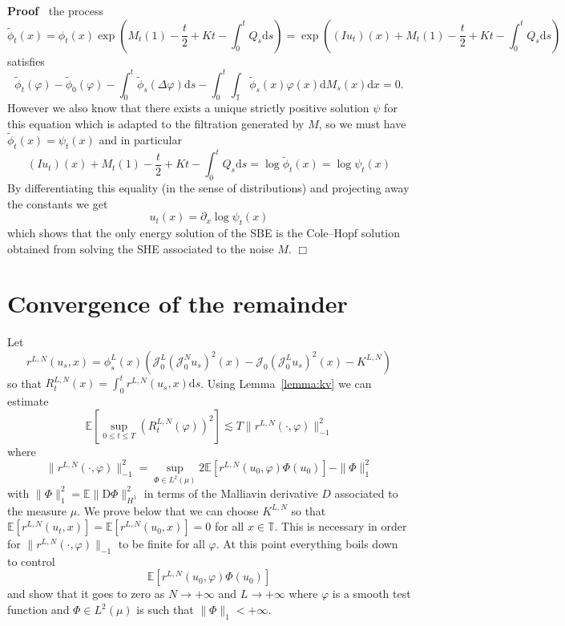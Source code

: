 \documentclass[a4paper,11pt]{article}
\newcommand{\mathD}{\mathrm{D}}
\newcommand{\mathd}{\mathrm{d}}
\newenvironment{proof}{\noindent\textbf{Proof\ }}{\hspace*{\fill}$\Box$\medskip}
\newcommand{\JJ}{\mathcal{J}}
\begin{document}
\begin{proof}
  the process
  \[ \tilde{\phi}_t (x) = \phi_t (x) \exp \left( M_t (1) - \frac{t}{2} + Kt -
     \int_0^t Q_s \mathd s \right) = \exp \left( (I u_t) (x) + M_t (1) -
     \frac{t}{2} + Kt - \int_0^t Q_s \mathd s \right) \]
  satisfies
  \[ \tilde{\phi}_t (\varphi) - \tilde{\phi}_0 (\varphi) - \int_0^t
     \tilde{\phi}_s (\Delta \varphi) \mathd s - \int_0^t \int_{\mathbb{T}}
     \tilde{\phi}_s (x) \varphi (x) \mathd M_s (x) \mathd x = 0. \]
  However we also know that there exists a unique strictly positive solution
  $\psi$ for this equation which is adapted to the filtration generated by
  $M$, so we must have $\tilde{\phi}_t (x) = \psi_t (x)$ and in particular
  \[ (I u_t) (x) + M_t (1) - \frac{t}{2} + Kt - \int_0^t Q_s \mathd s = \log
     \tilde{\phi}_t (x) = \log \psi_t (x) \]
  By differentiating this equality (in the sense of distributions) and
  projecting away the constants we get
  \[ u_t (x) = \partial_x \log \psi_t (x) \]
  which shows that the only energy solution of the SBE is the Cole--Hopf
  solution obtained from solving the SHE associated to the noise $M$.
\end{proof}

\section{Convergence of the remainder}\label{sec:remainder}

Let
\[ r^{L, N} (u_s, x) = \phi_s^L (x) (\JJ^L_0 \left( \JJ^N_0 u_s \right)^2 (x)
   - \JJ_0 (\JJ^L_0 u_s)^2 (x) - K^{L, N}) \]
so that $R_t^{L, N} (x) = \int_0^t r^{L, N} (u_s, x) \mathd s$. Using
Lemma~\ref{lemma:kv} we can estimate
\[ \mathbb{E} [\sup_{0 \leqslant t \leqslant T} (R^{L, N}_t (\varphi))^2]
   \lesssim T \| r^{L, N} (\cdot, \varphi) \|_{- 1}^2 \]
where
\[ \| r^{L, N} (\cdot, \varphi) \|_{- 1}^2 = \sup_{\Phi \in L^2 (\mu)}
   2\mathbb{E} [r^{L, N} (u_0, \varphi) \Phi (u_0)] - \| \Phi \|_1^2 \]
with $\| \Phi \|_1^2 =\mathbb{E} \| \mathD \Phi \|_{H^1}^2$ in terms of the
Malliavin derivative $D$ associated to the measure $\mu$. We prove below that
we can choose $K^{L, N}$ so that $\mathbb{E} [r^{L, N} (u_t, x)] =\mathbb{E}
[r^{L, N} (u_0, x)] = 0$ for all $x \in \mathbb{T}$. This is necessary in
order for $\| r^{L, N} (\cdot, \varphi) \|_{- 1}$ to be finite for all
$\varphi$. At this point everything boils down to control
\[ \mathbb{E} [r^{L, N} (u_0, \varphi) \Phi (u_0)] \]
and show that it goes to zero as $N \rightarrow + \infty$ and $L \rightarrow +
\infty$ where $\varphi$ is a smooth test function and $\Phi \in L^2 (\mu)$ is
such that $\| \Phi \|_1 < + \infty$.
\end{document}
